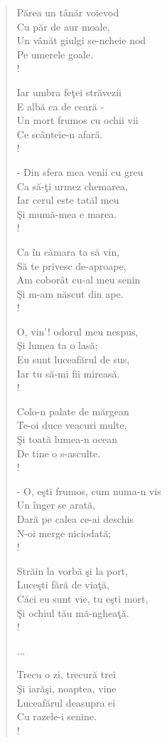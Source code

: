 \documentclass{article}
\begin{document}
\begin{small}
\begin{multicols}{3}
\begin{verse}
Părea un tânăr voievod \\
Cu păr de aur moale, \\
Un vânăt giulgi se-ncheie nod \\
Pe umerele goale. \\!

Iar umbra feţei străvezii \\
E albă ca de ceară - \\
Un mort frumos cu ochii vii \\
Ce scânteie-n afară. \\!

- Din sfera mea venii cu greu \\
Ca să-ţi urmez chemarea, \\
Iar cerul este tatăl meu \\
Şi mumă-mea e marea. \\!

Ca în cămara ta să vin, \\
Să te privesc de-aproape, \\
Am coborât cu-al meu senin \\
Şi m-am născut din ape. \\!

O, vin'! odorul meu nespus, \\
Şi lumea ta o lasă; \\
Eu sunt luceafărul de sus, \\
Iar tu să-mi fii mireasă. \\!

Colo-n palate de mărgean \\
Te-oi duce veacuri multe, \\
Şi toată lumea-n ocean \\
De tine o s-asculte. \\!

- O, eşti frumos, cum numa-n vis \\
Un înger se arată, \\
Dară pe calea ce-ai deschis \\
N-oi merge niciodată; \\!

Străin la vorbă şi la port, \\
Luceşti fără de viaţă, \\
Căci eu sunt vie, tu eşti mort, \\
Şi ochiul tău mă-ngheaţă. \\!

...

Trecu o zi, trecură trei \\
Şi iarăşi, noaptea, vine \\
Luceafărul deasupra ei \\
Cu razele-i senine. \\!


\end{verse}
\end{multicols}
\end{small}
\end{document}
